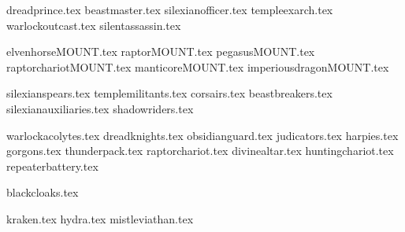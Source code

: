 
{dreadprince.tex}
{beastmaster.tex}
{silexianofficer.tex}
{templeexarch.tex}
{warlockoutcast.tex}
{silentassassin.tex}

\clearpage
{}
{elvenhorseMOUNT.tex}
{raptorMOUNT.tex}
{pegasusMOUNT.tex}
{raptorchariotMOUNT.tex}
{manticoreMOUNT.tex}
{imperiousdragonMOUNT.tex}

\clearpage
{}
{silexianspears.tex}
{templemilitants.tex}
{corsairs.tex}
{beastbreakers.tex}
{silexianauxiliaries.tex}
{shadowriders.tex}

\clearpage
{}
{warlockacolytes.tex}
{dreadknights.tex}
{obsidianguard.tex}
{judicators.tex}
{harpies.tex}
{gorgons.tex}
{thunderpack.tex}
{raptorchariot.tex}
{divinealtar.tex}
{huntingchariot.tex}
{repeaterbattery.tex}

\additionalspacebeforemaintitle{}
{blackcloaks.tex}

\clearpage
{}
{kraken.tex}
{hydra.tex}
{mistleviathan.tex}
